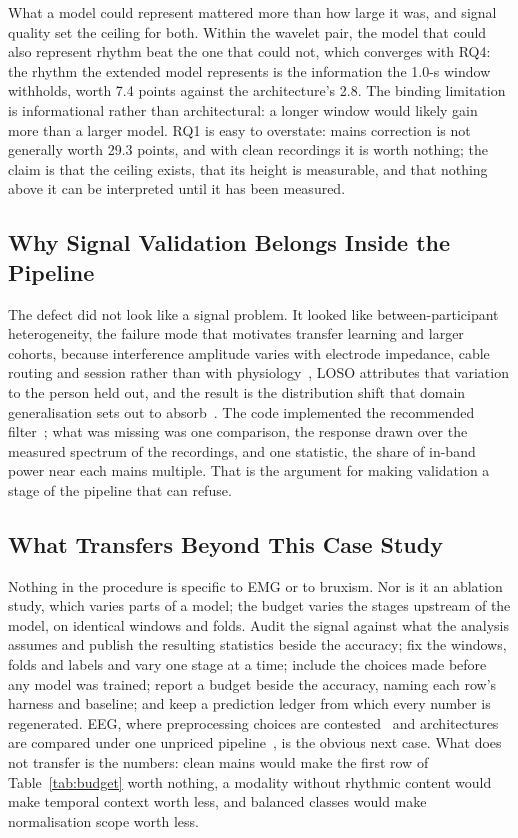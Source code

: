 \documentclass[journal]{IEEEtran}
\begin{document}
What a model could represent mattered more than how large it was, and signal quality set the ceiling for both. Within the wavelet pair, the model that could also represent rhythm beat the one that could not, which converges with RQ4: the rhythm the extended model represents is the information the 1.0-s window withholds, worth 7.4 points against the architecture's 2.8. The binding limitation is informational rather than architectural: a longer window would likely gain more than a larger model. RQ1 is easy to overstate: mains correction is not generally worth 29.3 points, and with clean recordings it is worth nothing; the claim is that the ceiling exists, that its height is measurable, and that nothing above it can be interpreted until it has been measured.

\subsection{Why Signal Validation Belongs Inside the Pipeline}

The defect did not look like a signal problem. It looked like between-participant heterogeneity, the failure mode that motivates transfer learning and larger cohorts, because interference amplitude varies with electrode impedance, cable routing and session rather than with physiology~\cite{deluca2010filtering,besomi2019consensus}, LOSO attributes that variation to the person held out, and the result is the distribution shift that domain generalisation sets out to absorb~\cite{wang2022generalizing}. The code implemented the recommended filter~\cite{chowdhury2013surface,raez2006techniques}; what was missing was one comparison, the response drawn over the measured spectrum of the recordings, and one statistic, the share of in-band power near each mains multiple. That is the argument for making validation a stage of the pipeline that can refuse.

\subsection{What Transfers Beyond This Case Study}
\label{sec:transfer}

Nothing in the procedure is specific to EMG or to bruxism. Nor is it an ablation study, which varies parts of a model; the budget varies the stages upstream of the model, on identical windows and folds. Audit the signal against what the analysis assumes and publish the resulting statistics beside the accuracy; fix the windows, folds and labels and vary one stage at a time; include the choices made before any model was trained; report a budget beside the accuracy, naming each row's harness and baseline; and keep a prediction ledger from which every number is regenerated. EEG, where preprocessing choices are contested~\cite{delorme2023eeg} and architectures are compared under one unpriced pipeline~\cite{bouthillier2021accounting}, is the obvious next case. What does not transfer is the numbers: clean mains would make the first row of Table~\ref{tab:budget} worth nothing, a modality without rhythmic content would make temporal context worth less, and balanced classes would make normalisation scope worth less.
\end{document}
